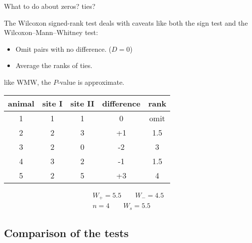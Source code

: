 \begin{frame}{What to do about zeros? ties?}

    The Wilcoxon signed-rank test deals with caveats like both
    the sign test and the Wilcoxon--Mann--Whitney test: \\
    \begin{itemize}
        \item Omit pairs with no difference. ($D=0$)
        \item Average the ranks of ties.
    \end{itemize}
     like WMW, the $P$-value is approximate.

    \vspace{2em}

    \begin{center}
\begin{tabular}{ccccc}
  \hline
  animal & site I & site II & difference & rank \\ 
  \hline
  1 &  1 & 1 & 0 & omit \\ 
  2 &  2 & 3 & +1 & 1.5 \\ 
  3 &  2 & 0 & -2 & 3 \\ 
  4 &  3 & 2 & -1 & 1.5 \\ 
  5 &  2 & 5 & +3 & 4 \\ 
   \hline
\end{tabular}
    \end{center}

    \vspace{2em}

    \begin{gather*}
        W_+ = 5.5  \qquad
        W_- = 4.5 \\
        n = 4 \qquad
        W_s = 5.5 
    \end{gather*}

\end{frame}

\subsection{Comparison of the tests}


